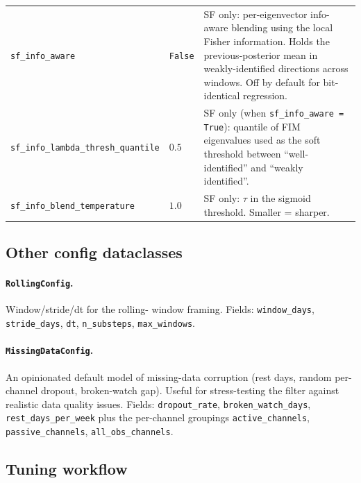 \begin{center}
\begin{longtable}{lp{3cm}p{8cm}}
\texttt{sf\_info\_aware}           & \texttt{False} & SF only: per-eigenvector info-aware blending using the local Fisher information. Holds the previous-posterior mean in weakly-identified directions across windows. Off by default for bit-identical regression. \\
\texttt{sf\_info\_lambda\_thresh\_quantile} & $0.5$ & SF only (when \texttt{sf\_info\_aware = True}): quantile of FIM eigenvalues used as the soft threshold between ``well-identified'' and ``weakly identified''. \\
\texttt{sf\_info\_blend\_temperature} & $1.0$ & SF only: $\tau$ in the sigmoid threshold. Smaller = sharper. \\
\bottomrule
\end{longtable}
\end{center}

\subsection{Other config dataclasses}

\paragraph{\texttt{RollingConfig}.} Window/stride/dt for the rolling-
window framing. Fields: \texttt{window\_days}, \texttt{stride\_days},
\texttt{dt}, \texttt{n\_substeps}, \texttt{max\_windows}.

\paragraph{\texttt{MissingDataConfig}.} An opinionated default model
of missing-data corruption (rest days, random per-channel dropout,
broken-watch gap). Useful for stress-testing the filter against
realistic data quality issues. Fields: \texttt{dropout\_rate},
\texttt{broken\_watch\_days}, \texttt{rest\_days\_per\_week} plus
the per-channel groupings \texttt{active\_channels},
\texttt{passive\_channels}, \texttt{all\_obs\_channels}.

\subsection{Tuning workflow}

